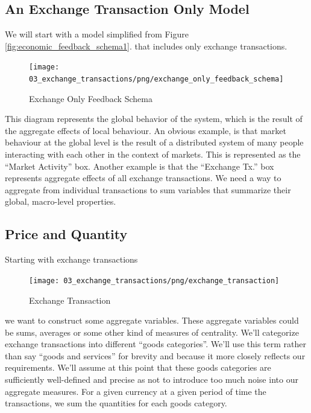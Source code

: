 \subsection{An Exchange Transaction Only Model}

We will start with a model simplified from Figure \ref{fig:economic_feedback_schema1}. that includes only
exchange transactions.

\begin{figure}[H]
\centering
\texttt{[image: 03\_exchange\_transactions/png/exchange\_only\_feedback\_schema]}
\caption{Exchange Only Feedback Schema}
\label{fig:exchange_only_feedback_schema1}
\end{figure}

This diagram represents the global behavior of the system, which is the result of the aggregate
effects of local behaviour. An obvious example, is that market behaviour at the global level is the
result of a distributed system of many people interacting with each other in the context of markets.
This is represented as the ``Market Activity'' box. Another example is that the ``Exchange Tx.'' box
represents aggregate effects of all exchange transactions. We need a way to aggregate from
individual transactions to sum variables that summarize their global, macro-level properties.

\subsection{Price and Quantity}

Starting with exchange transactions

\begin{figure}[H]
\centering
\texttt{[image: 03\_exchange\_transactions/png/exchange\_transaction]}
\caption{Exchange Transaction}
\label{fig:exchange_transaction2}
\end{figure}

we want to construct some aggregate variables. These aggregate variables could be sums, averages or
some other kind of measures of centrality. We'll categorize exchange transactions into different
``goods categories''. We'll use this term rather than say ``goods and services'' for brevity and
because it more closely reflects our requirements. We'll assume at this point that these goods
categories are sufficiently well-defined and precise as not to introduce too much noise into our
aggregate measures. For a given currency at a given period of time the transactions, we sum the
quantities for each goods category.

